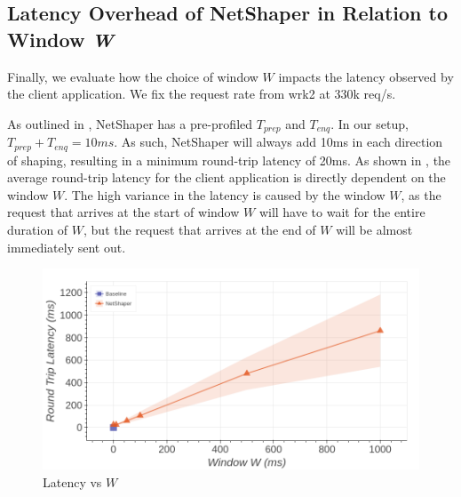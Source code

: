 \subsection{Latency Overhead of NetShaper in Relation to Window \textit{W}}
\label{subsec:netshaper-evaluation-latency}

Finally, we evaluate how the choice of window $W$ impacts the latency observed by the client application.
We fix the request rate from wrk2 at 330k req/s.

As outlined in , NetShaper has a pre-profiled $T_{prep}$ and $T_{enq}$.
In our setup, $T_{prep} + T_{enq} = 10ms$.
As such, NetShaper will always add 10ms in each direction of shaping, resulting in a minimum round-trip latency of 20ms.
As shown in , the average round-trip latency for the client application is directly dependent on the window $W$.
The high variance in the latency is caused by the window $W$, as the request that arrives at the start of window $W$ will have to wait for the entire duration of $W$, but the request that arrives at the end of $W$ will be almost immediately sent out.

\begin{figure}[!htb]
    \centering
    \includegraphics[width=\columnwidth]{figures/netshaper/evaluation/http_latency.png}
    \caption{Latency vs $W$}
    \label{fig:netshaper-eval-http-latency}
\end{figure}